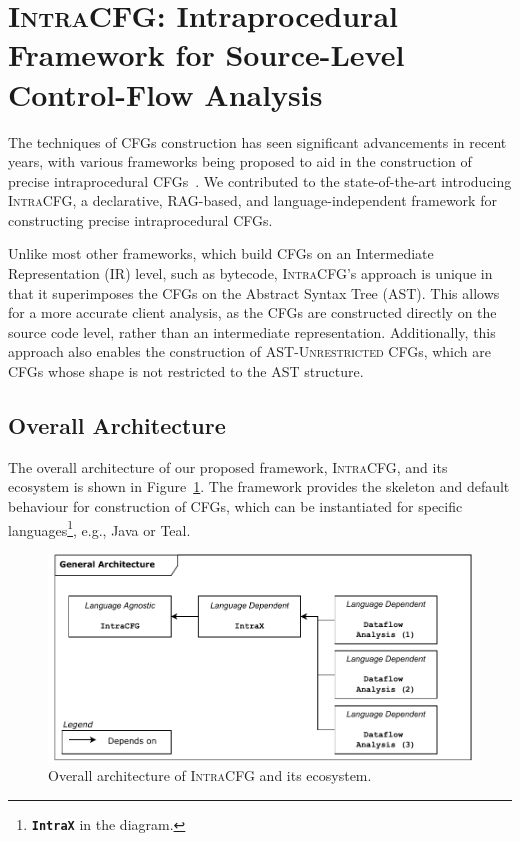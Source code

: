 \section{\textsc{IntraCFG}: Intraprocedural Framework for Source-Level Control-Flow Analysis}
The techniques of CFGs construction has seen significant advancements
in recent years, with various frameworks being proposed to aid in the construction 
of precise intraprocedural CFGs~\cite{smits2020flowspec,10.1016/j.scico.2012.02.002}.
We contributed to the state-of-the-art introducing \textsc{IntraCFG}, a declarative, RAG-based,
and language-independent framework for constructing precise intraprocedural CFGs.

Unlike most other frameworks, which build CFGs on an Intermediate Representation (IR) level,
such as bytecode, \textsc{IntraCFG}'s approach is unique in that it superimposes the CFGs 
on the Abstract Syntax Tree (AST). This allows for a more accurate client analysis,
as the CFGs are constructed directly on the source code level, rather than an
intermediate representation. Additionally, this approach also enables the construction 
of \textsc{AST-Unrestricted} CFGs, which are CFGs whose shape is not restricted to the AST structure.
\subsection{Overall Architecture}
The overall architecture of our proposed framework, \textsc{IntraCFG}, and its
ecosystem is shown in Figure~\ref{fig:intraCFG}. 
The framework provides the skeleton and default behaviour for construction of CFGs,
which can be instantiated for specific languages\footnote{\textbf{\texttt{IntraX}} in the diagram.}, e.g., Java or Teal. 
\begin{figure}[H]
    \centering
    \includegraphics[scale=0.7]{kappa/img/architecture.pdf}
    \caption{\label{fig:intraCFG} Overall architecture of \textsc{IntraCFG} and its ecosystem.}
\end{figure}

